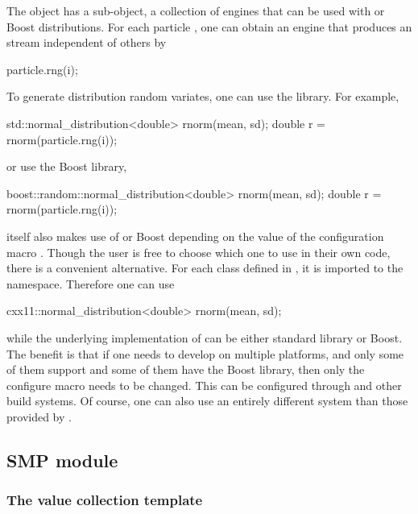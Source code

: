 The  object has a sub-object, a collection of \rng
engines that can be used with \cppoo{}  or Boost
distributions. For each particle , one can obtain an engine that
produces an \rng stream independent of others by
\begin{cppcode}
particle.rng(i);
\end{cppcode}
To generate distribution random variates, one can use the
\cppoo{}  library. For example,
\begin{cppcode}
std::normal_distribution<double> rnorm(mean, sd);
double r = rnorm(particle.rng(i));
\end{cppcode}
or use the Boost library,
\begin{cppcode}
boost::random::normal_distribution<double> rnorm(mean, sd);
double r = rnorm(particle.rng(i));
\end{cppcode}
\vsmc itself also makes use of \cppoo{}  or Boost
depending on the value of the configuration macro
. Though the user is free to choose which
one to use in their own code, there is a convenient alternative. For each
class defined in \cppoo{} , it is imported to the
 namespace. Therefore one can use
\begin{cppcode}
cxx11::normal_distribution<double> rnorm(mean, sd);
\end{cppcode}
while the underlying implementation of  can be
either \cppoo standard library or Boost. The benefit is that if one needs to
develop on multiple platforms, and only some of them support \cppoo and some
of them have the Boost library, then only the configure macro
 needs to be changed. This can be
configured through \cmake and other build systems. Of course, one can also use
an entirely different \rng system than those provided by \vsmc.

\subsection{SMP module}
\label{sub:SMP module}

\subsubsection{The value collection template}
\label{ssub:The value collection template}

